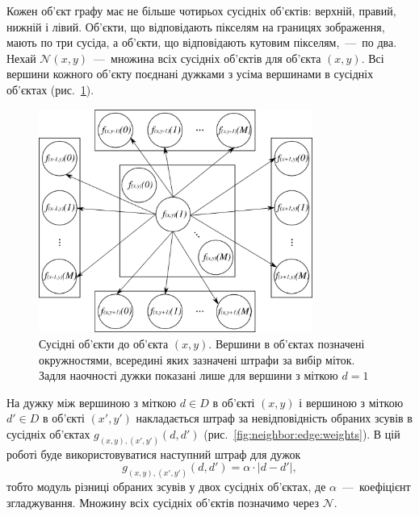 Кожен об'єкт графу має не більше чотирьох сусідніх об'єктів: верхній, правий,
нижній і лівий.
Об'єкти, що відповідають пікселям на границях зображення, мають по три сусіда,
а об'єкти, що відповідають кутовим пікселям,~---~по два.
Нехай $\mathcal{N} \left( x, y \right) $~---~множина всіх
сусідніх об'єктів для об'єкта $\left( x, y \right)$.
Всі вершини кожного об'єкту поєднані дужками з усіма
вершинами в сусідніх об'єктах (рис.~\ref{fig:neighbors}).

\begin{figure}[h]
  \centering
  \includegraphics[width=0.8\textwidth]{images/neighbors}
  \caption{Сусідні об'єкти до об'єкта $\left(x, y \right)$.
           Вершини в об'єктах позначені окружностями,
           всередині яких зазначені штрафи за вибір міток.
           Задля наочності дужки показані лише для вершини з міткою $d = 1$}
  \label{fig:neighbors}
\end{figure}

На дужку між вершиною з міткою $d \in D$ в об'єкті $\left(x, y \right)$
і вершиною з міткою $d' \in D$ в об'єкті $\left(x', y' \right)$
накладається штраф за невідповідність обраних зсувів в сусідніх об'єктах
$g_{\left(x, y \right), \left(x', y' \right)} \left(d, d' \right)$
(рис.~\ref{fig:neighbor:edge:weights}).
В цій роботі буде використовуватися наступний штраф для дужок
\begin{equation*}
    g_{\left(x, y \right), \left(x', y' \right)} \left(d, d' \right) =
        \alpha \cdot \left| d - d' \right|,
\end{equation*}
тобто модуль різниці обраних зсувів у двох сусідніх об'єктах,
де $\alpha$~---~коефіцієнт згладжування.
Множину всіх сусідніх об'єктів позначимо через $\mathcal{N}$.

